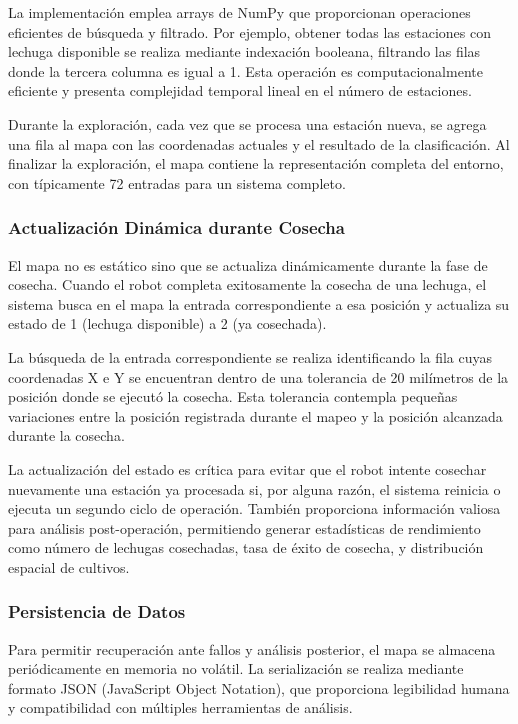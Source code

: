 La implementación emplea arrays de NumPy que proporcionan operaciones eficientes de búsqueda y filtrado. Por ejemplo, obtener todas las estaciones con lechuga disponible se realiza mediante indexación booleana, filtrando las filas donde la tercera columna es igual a 1. Esta operación es computacionalmente eficiente y presenta complejidad temporal lineal en el número de estaciones.

Durante la exploración, cada vez que se procesa una estación nueva, se agrega una fila al mapa con las coordenadas actuales y el resultado de la clasificación. Al finalizar la exploración, el mapa contiene la representación completa del entorno, con típicamente 72 entradas para un sistema completo.

\subsubsection{Actualización Dinámica durante Cosecha}

El mapa no es estático sino que se actualiza dinámicamente durante la fase de cosecha. Cuando el robot completa exitosamente la cosecha de una lechuga, el sistema busca en el mapa la entrada correspondiente a esa posición y actualiza su estado de 1 (lechuga disponible) a 2 (ya cosechada).

La búsqueda de la entrada correspondiente se realiza identificando la fila cuyas coordenadas X e Y se encuentran dentro de una tolerancia de 20 milímetros de la posición donde se ejecutó la cosecha. Esta tolerancia contempla pequeñas variaciones entre la posición registrada durante el mapeo y la posición alcanzada durante la cosecha.

La actualización del estado es crítica para evitar que el robot intente cosechar nuevamente una estación ya procesada si, por alguna razón, el sistema reinicia o ejecuta un segundo ciclo de operación. También proporciona información valiosa para análisis post-operación, permitiendo generar estadísticas de rendimiento como número de lechugas cosechadas, tasa de éxito de cosecha, y distribución espacial de cultivos.

\subsubsection{Persistencia de Datos}

Para permitir recuperación ante fallos y análisis posterior, el mapa se almacena periódicamente en memoria no volátil. La serialización se realiza mediante formato JSON (JavaScript Object Notation), que proporciona legibilidad humana y compatibilidad con múltiples herramientas de análisis.


